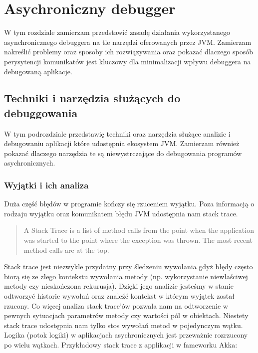 \chapter{Asychroniczny debugger}

W tym rozdziale zamierzam przedstawić zasadę działania wykorzystanego asynchronicznego debuggera na tle narzędzi oferowanych przez JVM. Zamierzam nakreślić problemy oraz sposoby ich rozwiązywania oraz pokazać dlaczego sposób perysytencji komunikatów jest kluczowy dla minimalizacji wpływu debuggera na debugowaną aplikacje. 


\section{Techniki i narzędzia służących do debuggowania}

W tym podrozdziale przedstawię techniki oraz narzędzia służące analizie i debugowaniu aplikacji które udostępnia ekosystem JVM. Zamierzam również pokazać dlaczego narzędzia te są niewystrczające do debugowania programów asychronicznych.

\subsection{Wyjątki i ich analiza}
Duża część błędów w programie kończy się rzuceniem wyjątku. Poza informacją o rodzaju wyjątku oraz komunikatem błędu JVM udostępnia nam stack trace.

\begin{quote}
A Stack Trace is a list of method calls from the point when the application was started to the point where the exception was thrown. The most recent method calls are at the top.~\cite{javaProgramming}
\end{quote} 

Stack trace jest niezwykle przydatny przy śledzeniu wywołania gdyż błędy często biorą się ze złego kontekstu wywołania metody (np. wykorzystanie niewłaściwej metody czy nieskończona rekurusja). Dzięki jego analizie jesteśmy w stanie odtworzyć historie wywołań oraz znaleźć kontekst w którym wyjątek został rzucony. Co więcej analiza stack trace'ów pozwala nam na odtworzenie w pewnych sytuacjach parametrów metody czy wartości pól w obiektach.
Niestety stack trace udostępnia nam tylko stos wywołań metod w pojedynczym wątku. Logika (potok logiki) w aplikacjach asychronicznych jest przeważnie rozrzucony po wielu wątkach. Przykładowy stack trace z applikacji w fameworku Akka:


